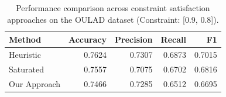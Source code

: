 \begin{table}[htbp]
\caption{Performance comparison across constraint satisfaction approaches on the OULAD dataset (Constraint: [0.9, 0.8]).}
\label{tab:results_comparison}
\begin{tabular}{lrrrr}
\toprule
Method & Accuracy & Precision & Recall & F1 \\
\midrule
Heuristic & 0.7624 & 0.7307 & 0.6873 & 0.7015 \\
Saturated & 0.7557 & 0.7075 & 0.6702 & 0.6816 \\
Our Approach & 0.7466 & 0.7285 & 0.6512 & 0.6695 \\
\bottomrule
\end{tabular}
\end{table}
